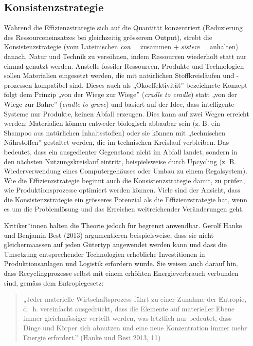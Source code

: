 \documentclass[
  nswissgerman,
  a4paper,
  DIV=11,
  numbers=noendperiod,
  oneside,
  openany]{scrreprt}
\begin{document}
\subsection{Konsistenzstrategie}\label{konsistenzstrategie}

Während die Effizienzstrategie sich auf die Quantität konzentriert
(Reduzierung des Ressourceneinsatzes bei gleichzeitig grösserem Output),
strebt die Konsistenzstrategie (vom Lateinischen \emph{con} = zusammen +
\emph{sistere} = anhalten) danach, Natur und Technik zu versöhnen, indem
Ressourcen wiederholt statt nur einmal genutzt werden. Anstelle fossiler
Ressourcen, Produkte und Technologien sollen Materialien eingesetzt
werden, die mit natürlichen Stoffkreisläufen und -prozessen kompatibel
sind. Dieses auch als „Ökoeffektivität'' bezeichnete Konzept folgt dem
Prinzip „von der Wiege zur Wiege'' (\emph{cradle to cradle}) statt „von
der Wiege zur Bahre'' (\emph{cradle to grave}) und basiert auf der Idee,
dass intelligente Systeme nur Produkte, keinen Abfall erzeugen. Dies
kann auf zwei Wegen erreicht werden: Materialien können entweder
biologisch abbaubar sein (z. B. ein Shampoo aus natürlichen
Inhaltsstoffen) oder sie können mit „technischen Nährstoffen'' gestaltet
werden, die im technischen Kreislauf verbleiben. Das bedeutet, dass ein
ausgedienter Gegenstand nicht im Abfall landet, sondern in den nächsten
Nutzungskreislauf eintritt, beispielsweise durch Upcycling (z. B.
Wiederverwendung eines Computergehäuses oder Umbau zu einem
Regalsystem). Wie die Effizienzstrategie beginnt auch die
Konsistenzstrategie damit, zu prüfen, wie Produktionsprozesse optimiert
werden können. Viele sind der Ansicht, dass die Konsistenzstrategie ein
grösseres Potenzial als die Effizienzstrategie hat, wenn es um die
Problemlösung und das Erreichen weitreichender Veränderungen geht.

Kritiker*innen halten die Theorie jedoch für begrenzt anwendbar. Gerolf
Hanke und Benjamin Best (2013) argumentieren beispielsweise, dass sie
nicht gleichermaassen auf jeden Gütertyp angewendet werden kann und dass
die Umsetzung entsprechender Technologien erhebliche Investitionen in
Produktionsanlagen und Logistik erfordern würde. Sie weisen auch darauf
hin, dass Recyclingprozesse selbst mit einem erhöhten Energieverbrauch
verbunden sind, gemäss dem Entropiegesetz:

\begin{quote}
„Jeder materielle Wirtschaftsprozess führt zu einer Zunahme der
Entropie, d.~h. vereinfacht ausgedrückt, dass die Elemente auf
materieller Ebene immer gleichmässiger verteilt werden, was letztlich
nur bedeutet, dass Dinge und Körper sich abnutzen und eine neue
Konzentration immer mehr Energie erfordert.'' (Hanke und Best 2013, 11)
\end{quote}
\end{document}
